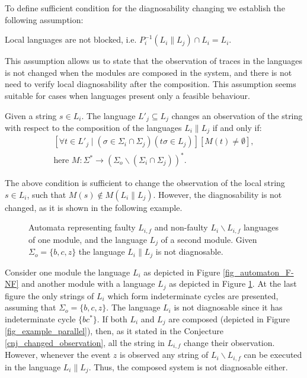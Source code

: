 \documentclass[a4paper, 10pt, conference]{ieeeconf}
\begin{document}
To define sufficient condition for the diagnosability changing we establish the
following assumption:

\begin{assumption}
Local languages are not blocked, i.e. 
$P^{-1}_i(L_i \parallel L_j)\cap L_i = L_i$.
\end{assumption}

This assumption allows us to state that the observation of traces in the
languages is not changed when the modules are composed in the system, and there
is not need to verify local diagnosability after the composition.
This assumption seems suitable for cases when languages present only a feasible
behaviour.

\begin{conjecture}
\label{cnj_changed_observation}
Given a string $ s \in L_i$. The language $L'_j \subseteq L_j$ changes an observation
of the string with respect to the composition of the languages $L_i \parallel L_j$
if and only if:
$$
\begin{array}{l}
	[
		\forall t \in L'_j \mid (\sigma \in \Sigma_i \cap \Sigma_j)
		(t\sigma \in L_j)
	]
	[M(t) \neq \emptyset],
	\\[1ex]
	\textrm{here } M: \Sigma^* \rightarrow 
	(\Sigma_o \backslash (\Sigma_i \cap	\Sigma_j))^*.
\end{array}
$$
\end{conjecture}

The above condition is sufficient to change the observation of the local string
$s \in L_i$, such that $M(s) \not \in M(L_i \parallel L_j)$. However, the
diagnosability is not changed, as it is shown in the following example.

\begin{figure}[t]
\centering

\caption{Automata representing faulty $L_{i,f}$ and
non-faulty $L_i \backslash L_{i,f}$ languages of one module, and the language
$L_j$ of a second module. Given $\Sigma_o = \{b, c, z\}$ the language $L_i
\parallel L_j$ is not diagnosable.}
\label{fig_changed_observation}
\end{figure}

\begin{example} Consider one module the language $L_i$ as depicted in
Figure \ref{fig_automaton_F-NF} and another module with a language $L_j$ as
depicted in Figure \ref{fig_changed_observation}. At the last figure the
only strings of $L_i$ which form indeterminate cycles are presented, assuming that 
$\Sigma_o = \{b, c, z\}$. The language $L_i$ is not diagnosable since it has
indeterminate cycle $\{bc^*\}$. If both $L_i$ and $L_j$ are composed
(depicted in Figure \ref{fig_example_parallel}), then, as it
stated in the Conjecture \ref{cnj_changed_observation}, all the string in
$L_{i,f}$ change their observation.
However, whenever the event $z$ is observed any string of $L_i\backslash
L_{i,f}$ can be executed in the language $L_i \parallel L_j$.
Thus, the composed system is not diagnosable either.
\end{example}
\end{document}
